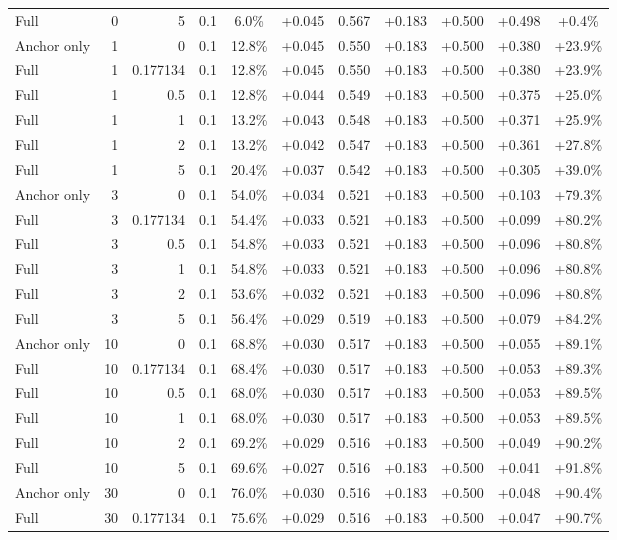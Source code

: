 \begin{table}[htbp]
\begin{tabular}{lrrrccccccc}
Full & 0 & 5 & 0.1 & 6.0\% & +0.045 & 0.567 & +0.183 & +0.500 & +0.498 & +0.4\% \\
Anchor only & 1 & 0 & 0.1 & 12.8\% & +0.045 & 0.550 & +0.183 & +0.500 & +0.380 & +23.9\% \\
Full & 1 & 0.177134 & 0.1 & 12.8\% & +0.045 & 0.550 & +0.183 & +0.500 & +0.380 & +23.9\% \\
Full & 1 & 0.5 & 0.1 & 12.8\% & +0.044 & 0.549 & +0.183 & +0.500 & +0.375 & +25.0\% \\
Full & 1 & 1 & 0.1 & 13.2\% & +0.043 & 0.548 & +0.183 & +0.500 & +0.371 & +25.9\% \\
Full & 1 & 2 & 0.1 & 13.2\% & +0.042 & 0.547 & +0.183 & +0.500 & +0.361 & +27.8\% \\
Full & 1 & 5 & 0.1 & 20.4\% & +0.037 & 0.542 & +0.183 & +0.500 & +0.305 & +39.0\% \\
Anchor only & 3 & 0 & 0.1 & 54.0\% & +0.034 & 0.521 & +0.183 & +0.500 & +0.103 & +79.3\% \\
Full & 3 & 0.177134 & 0.1 & 54.4\% & +0.033 & 0.521 & +0.183 & +0.500 & +0.099 & +80.2\% \\
Full & 3 & 0.5 & 0.1 & 54.8\% & +0.033 & 0.521 & +0.183 & +0.500 & +0.096 & +80.8\% \\
Full & 3 & 1 & 0.1 & 54.8\% & +0.033 & 0.521 & +0.183 & +0.500 & +0.096 & +80.8\% \\
Full & 3 & 2 & 0.1 & 53.6\% & +0.032 & 0.521 & +0.183 & +0.500 & +0.096 & +80.8\% \\
Full & 3 & 5 & 0.1 & 56.4\% & +0.029 & 0.519 & +0.183 & +0.500 & +0.079 & +84.2\% \\
Anchor only & 10 & 0 & 0.1 & 68.8\% & +0.030 & 0.517 & +0.183 & +0.500 & +0.055 & +89.1\% \\
Full & 10 & 0.177134 & 0.1 & 68.4\% & +0.030 & 0.517 & +0.183 & +0.500 & +0.053 & +89.3\% \\
Full & 10 & 0.5 & 0.1 & 68.0\% & +0.030 & 0.517 & +0.183 & +0.500 & +0.053 & +89.5\% \\
Full & 10 & 1 & 0.1 & 68.0\% & +0.030 & 0.517 & +0.183 & +0.500 & +0.053 & +89.5\% \\
Full & 10 & 2 & 0.1 & 69.2\% & +0.029 & 0.516 & +0.183 & +0.500 & +0.049 & +90.2\% \\
Full & 10 & 5 & 0.1 & 69.6\% & +0.027 & 0.516 & +0.183 & +0.500 & +0.041 & +91.8\% \\
Anchor only & 30 & 0 & 0.1 & 76.0\% & +0.030 & 0.516 & +0.183 & +0.500 & +0.048 & +90.4\% \\
Full & 30 & 0.177134 & 0.1 & 75.6\% & +0.029 & 0.516 & +0.183 & +0.500 & +0.047 & +90.7\% \\

\end{tabular}
\end{table}
